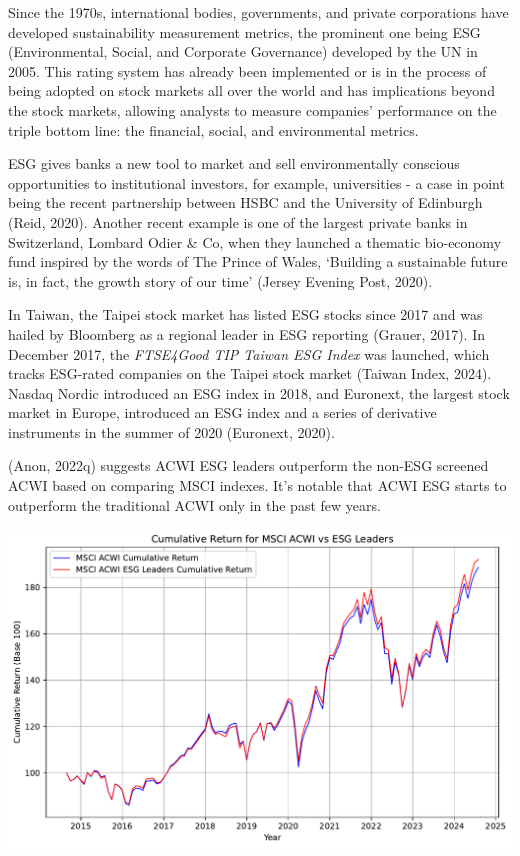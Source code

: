 \documentclass[
  letterpaper,
  DIV=11,
  numbers=noendperiod]{scrartcl}
\begin{document}
Since the 1970s, international bodies, governments, and private
corporations have developed sustainability measurement metrics, the
prominent one being ESG (Environmental, Social, and Corporate
Governance) developed by the UN in 2005. This rating system has already
been implemented or is in the process of being adopted on stock markets
all over the world and has implications beyond the stock markets,
allowing analysts to measure companies' performance on the triple bottom
line: the financial, social, and environmental metrics.

ESG gives banks a new tool to market and sell environmentally conscious
opportunities to institutional investors, for example, universities - a
case in point being the recent partnership between HSBC and the
University of Edinburgh (Reid, 2020). Another recent example is one of
the largest private banks in Switzerland, Lombard Odier \& Co, when they
launched a thematic bio-economy fund inspired by the words of The Prince
of Wales, `Building a sustainable future is, in fact, the growth story
of our time' (Jersey Evening Post, 2020).

In Taiwan, the Taipei stock market has listed ESG stocks since 2017 and
was hailed by Bloomberg as a regional leader in ESG reporting (Grauer,
2017). In December 2017, the \emph{FTSE4Good TIP Taiwan ESG Index} was
launched, which tracks ESG-rated companies on the Taipei stock market
(Taiwan Index, 2024). Nasdaq Nordic introduced an ESG index in 2018, and
Euronext, the largest stock market in Europe, introduced an ESG index
and a series of derivative instruments in the summer of 2020 (Euronext,
2020).

(Anon, 2022q) suggests ACWI ESG leaders outperform the non-ESG screened
ACWI based on comparing MSCI indexes. It's notable that ACWI ESG starts
to outperform the traditional ACWI only in the past few years.

\includegraphics{_thesis_files/figure-pdf/cell-53-output-1.pdf}
\end{document}
